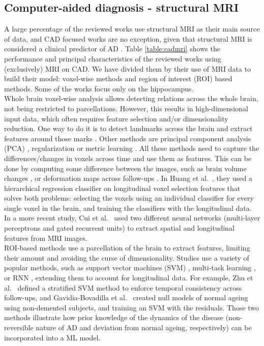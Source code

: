 \subsection{Computer-aided diagnosis - structural MRI}

A large percentage of the reviewed works use structural MRI as their main source of data, and CAD focused works are no exception, given that structural MRI is considered a clinical predictor of AD \cite{Adaszewski2013}. Table \ref{table:cadmri} shows the performance and principal characteristics of the reviewed works using (exclusively) MRI on CAD. We have divided them by their use of MRI data to build their model: voxel-wise methods and region of interest (ROI) based methods. Some of the works focus only on the hippocampus. \\ 

Whole brain voxel-wise analysis allows detecting relations across the whole brain, not being restricted to parcellations. However, this results in high-dimensional input data, which often requires feature selection and/or dimensionality reduction. One way to do it is to detect landmarks across the brain and extract features around those marks \cite{Farzan2015,Zhang2017a}. Other methods are principal component analysis (PCA) \cite{Aksman2016,Farzan2015,Sun2017}, regularization \cite{Ortiz2017} or metric learning \cite{Shi2015}. All these methods need to capture the differences/changes in voxels across time and use them as features. This can be done by computing some difference between the images, such as brain volume changes \cite{Farzan2015}, or deformation maps across follow-ups \cite{Davatzikos2009,Misra2009,Sun2017}. In Huang et al.\ \cite{Huang2016b}, they used a hierarchical regression classifier on longitudinal voxel selection features that solves both problems: selecting the voxels using an individual classifier for every single voxel in the brain, and training the classifiers with the longitudinal data. In a more recent study, Cui et al.\ \cite{Cui2018} used two different neural networks (multi-layer perceptrons and gated recurrent units) to extract spatial and longitudinal features from MRI images. \\ 

ROI-based methods use a parcellation of the brain to extract features, limiting their amount and avoiding the curse of dimensionality. Studies use a variety of popular methods, such as support vector machines (SVM) \cite{Gavidia-Bovadilla2017,Guan2017,Li2012,Zhu2016a}, multi-task learning \cite{Liu2013}, or RNN \cite{Ghazi2019}, extending them to account for longitudinal data. For example, Zhu et al.\ \cite{Zhu2016a} defined a stratified SVM method to enforce temporal consistency across follow-ups, and Gavidia-Bovadilla et al.\ \cite{Gavidia-Bovadilla2017} created null models of normal ageing using non-demented subjects, and training an SVM with the residuals. Those two methods illustrate how prior knowledge of the dynamics of the disease (non-reversible nature of AD and deviation from normal ageing, respectively) can be incorporated into a ML model. \\


